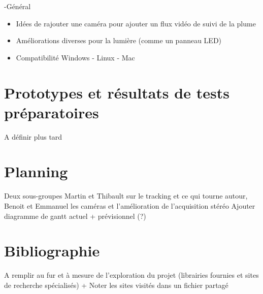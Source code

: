 \documentclass{article}
\begin{document}
-Général
\begin{itemize}
\item Idées de rajouter une caméra pour ajouter un flux vidéo de suivi de la plume
\item Améliorations diverses pour la lumière (comme un panneau LED)
\item Compatibilité Windows - Linux - Mac
\end{itemize}

\section{Prototypes et résultats de tests préparatoires}
A définir plus tard

\section{Planning}
Deux sous-groupes
Martin et Thibault sur le tracking et ce qui tourne autour, Benoit et Emmanuel les caméras et l'amélioration de l'acquisition stéréo
Ajouter diagramme de gantt actuel + prévisionnel (?)

\section{Bibliographie}
A remplir au fur et à mesure de l'exploration du projet (librairies fournies et sites de recherche spécialisés) + Noter les sites visités dans un fichier partagé
 
 
\end{document}

